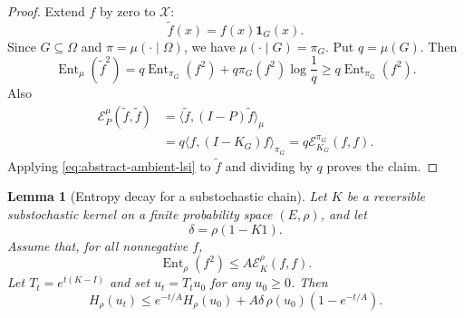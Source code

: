 \documentclass[11pt, reqno]{amsart}
\numberwithin{equation}{section}
\newtheorem{lemma}[theorem]{Lemma}
\newcommand{\Ent}{\operatorname{Ent}}
\newcommand{\cE}{\mathcal E}
\newcommand{\one}{\mathbf 1}
\newcommand{\wt}{\widetilde}
\begin{document}
\begin{proof}
Extend \(f\) by zero to \(\mathcal X\):
\[
    \wt f(x)=f(x)\one_G(x).
\]
Since \(G\subseteq\Omega\) and \(\pi=\mu(\cdot\mid\Omega)\), we have
\(\mu(\cdot\mid G)=\pi_G\).  Put \(q=\mu(G)\).  Then
\[
    \Ent_\mu(\wt f^2)
    =q\Ent_{\pi_G}(f^2)+q\pi_G(f^2)\log\frac1q
    \ge q\Ent_{\pi_G}(f^2).
\]
Also
\[
\begin{aligned}
    \cE_P^\mu(\wt f,\wt f)
    &=\langle \wt f,(I-P)\wt f\rangle_\mu  \\
    &=q\langle f,(I-K_G)f\rangle_{\pi_G}
     =q\cE_{K_G}^{\pi_G}(f,f).
\end{aligned}
\]
Applying \eqref{eq:abstract-ambient-lsi} to \(\wt f\) and dividing by \(q\)
proves the claim.
\end{proof}

\begin{lemma}[Entropy decay for a substochastic chain]\label{lem:abstract-killed-entropy}
Let \(K\) be a reversible substochastic kernel on a finite probability space
\((E,\rho)\), and let
\[
    \delta=\rho(1-K1).
\]
Assume that, for all nonnegative \(f\),
\begin{equation}\label{eq:abstract-substoch-lsi}
    \Ent_\rho(f^2)\le A\cE_K^\rho(f,f).
\end{equation}
Let \(T_t=e^{t(K-I)}\) and set \(u_t=T_tu_0\) for any \(u_0\ge0\). Then
\begin{equation}\label{eq:abstract-killed-entropy-decay}
    H_\rho(u_t)
    \le
    e^{-t/A}H_\rho(u_0)
    +A\delta\,\rho(u_0)(1-e^{-t/A}).
\end{equation}
\end{lemma}
\end{document}
